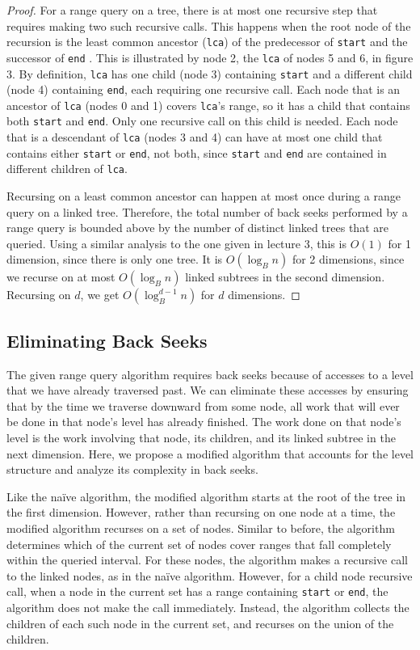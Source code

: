 \documentclass[11pt, oneside]{article}
\newcommand{\ms}{\texttt}
\begin{document}
\begin{proof}
    For a range query on a tree, there is at most one recursive step that
    requires making two such recursive calls. This happens when the root node of
    the recursion is the least common ancestor (\ms{lca}) of the predecessor of
    \ms{start} and the successor of \ms{end} \cite{lecture}. This is illustrated
    by node 2, the \ms{lca} of nodes 5 and 6, in figure 3. By definition,
    \ms{lca} has one child (node 3) containing \ms{start} and a different child
    (node 4) containing \ms{end}, each requiring one recursive call. Each node
    that is an ancestor of \ms{lca} (nodes 0 and 1) covers
    \ms{lca}'s range, so it has a child that contains both \ms{start} and
    \ms{end}. Only one recursive call on this child is needed. Each node that is
    a descendant of \ms{lca} (nodes 3 and 4) can have at most one child that
    contains either \ms{start} or \ms{end}, not both, since \ms{start} and
    \ms{end} are contained in different children of \ms{lca}. 

    Recursing on a least common ancestor can happen at most once during a range
    query on a linked tree. Therefore, the total number of back seeks performed
    by a range query is bounded above by the number of distinct linked trees
    that are queried. Using a similar analysis to the one given in lecture 3,
    this is $O(1)$ for 1 dimension, since there is only one tree. It is
    $O(\log_B n)$ for 2 dimensions, since we recurse on at most $O(\log_B n)$
    linked subtrees in the second dimension. Recursing on $d$, we get
    $O(\log_B^{d-1}n)$ for $d$ dimensions.

\end{proof}

\subsection{Eliminating Back Seeks}

The given range query algorithm requires back seeks because of accesses to a
level that we have already traversed past. We can eliminate these accesses by
ensuring that by the time we traverse downward from some node, all work that
will ever be done in that node's level has already finished. The work done on
that node's level is the work involving that node, its children, and its linked
subtree in the next dimension. Here, we propose a modified algorithm that
accounts for the level structure and analyze its complexity in back seeks.

Like the na{\"i}ve algorithm, the modified algorithm starts at the root of the tree
in the first dimension. However, rather than recursing on one node at a time,
the modified algorithm recurses on a set of nodes. Similar to before, the
algorithm determines which of the current set of nodes cover ranges that
fall completely within the queried interval. For these nodes, the algorithm
makes a recursive call to the linked nodes, as in the na{\"i}ve algorithm. However,
for a child node recursive call, when a node in the current set has a range
containing \ms{start} or \ms{end}, the algorithm does not make the call
immediately. Instead, the algorithm collects the children of each such node in
the current set, and recurses on the union of the children.
\end{document}
